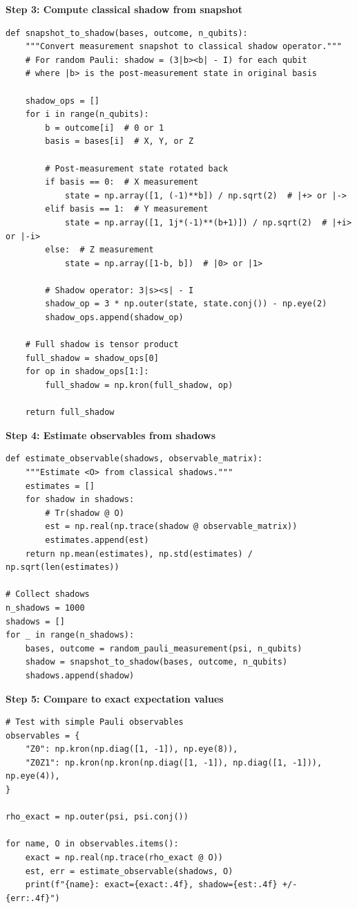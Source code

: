 \documentclass[11pt,a4paper]{article}
\begin{document}
\textbf{Step 3: Compute classical shadow from snapshot}
\begin{lstlisting}
def snapshot_to_shadow(bases, outcome, n_qubits):
    """Convert measurement snapshot to classical shadow operator."""
    # For random Pauli: shadow = (3|b><b| - I) for each qubit
    # where |b> is the post-measurement state in original basis
    
    shadow_ops = []
    for i in range(n_qubits):
        b = outcome[i]  # 0 or 1
        basis = bases[i]  # X, Y, or Z
        
        # Post-measurement state rotated back
        if basis == 0:  # X measurement
            state = np.array([1, (-1)**b]) / np.sqrt(2)  # |+> or |->
        elif basis == 1:  # Y measurement
            state = np.array([1, 1j*(-1)**(b+1)]) / np.sqrt(2)  # |+i> or |-i>
        else:  # Z measurement
            state = np.array([1-b, b])  # |0> or |1>
        
        # Shadow operator: 3|s><s| - I
        shadow_op = 3 * np.outer(state, state.conj()) - np.eye(2)
        shadow_ops.append(shadow_op)
    
    # Full shadow is tensor product
    full_shadow = shadow_ops[0]
    for op in shadow_ops[1:]:
        full_shadow = np.kron(full_shadow, op)
    
    return full_shadow
\end{lstlisting}

\textbf{Step 4: Estimate observables from shadows}
\begin{lstlisting}
def estimate_observable(shadows, observable_matrix):
    """Estimate <O> from classical shadows."""
    estimates = []
    for shadow in shadows:
        # Tr(shadow @ O)
        est = np.real(np.trace(shadow @ observable_matrix))
        estimates.append(est)
    return np.mean(estimates), np.std(estimates) / np.sqrt(len(estimates))

# Collect shadows
n_shadows = 1000
shadows = []
for _ in range(n_shadows):
    bases, outcome = random_pauli_measurement(psi, n_qubits)
    shadow = snapshot_to_shadow(bases, outcome, n_qubits)
    shadows.append(shadow)
\end{lstlisting}

\textbf{Step 5: Compare to exact expectation values}
\begin{lstlisting}
# Test with simple Pauli observables
observables = {
    "Z0": np.kron(np.diag([1, -1]), np.eye(8)),
    "Z0Z1": np.kron(np.kron(np.diag([1, -1]), np.diag([1, -1])), np.eye(4)),
}

rho_exact = np.outer(psi, psi.conj())

for name, O in observables.items():
    exact = np.real(np.trace(rho_exact @ O))
    est, err = estimate_observable(shadows, O)
    print(f"{name}: exact={exact:.4f}, shadow={est:.4f} +/- {err:.4f}")
\end{lstlisting}
\end{document}
